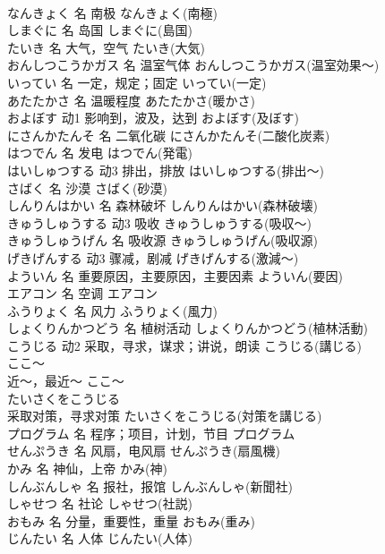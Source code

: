 \documentclass[8pt]{extreport}
\begin{document}
\begin{CJK}{UTF8}{min}
\\	なんきょく	名	南极	なんきょく(南極)	
\\	しまぐに	名	岛国	しまぐに(島国)	
\\	たいき	名	大气，空气	たいき(大気)	
\\	おんしつこうかガス	名	温室气体	おんしつこうかガス(温室効果～)	
\\	いってい	名	一定，规定；固定	いってい(一定)	
\\	あたたかさ	名	温暖程度	あたたかさ(暖かさ)	
\\	およぼす	动1	影响到，波及，达到	およぼす(及ぼす)	
\\	にさんかたんそ	名	二氧化碳	にさんかたんそ(二酸化炭素)	
\\	はつでん	名	发电	はつでん(発電)	
\\	はいしゅつする	动3	排出，排放	はいしゅつする(排出～)	
\\	さばく	名	沙漠	さばく(砂漠)	
\\	しんりんはかい	名	森林破坏	しんりんはかい(森林破壊)	
\\	きゅうしゅうする	动3	吸收	きゅうしゅうする(吸収～)	
\\	きゅうしゅうげん	名	吸收源	きゅうしゅうげん(吸収源)	
\\	げきげんする	动3	骤减，剧减	げきげんする(激減～)	
\\	よういん	名	重要原因，主要原因，主要因素	よういん(要因)	
\\	エアコン	名	空调	エアコン	
\\	ふうりょく	名	风力	ふうりょく(風力)	
\\	しょくりんかつどう	名	植树活动	しょくりんかつどう(植林活動)	
\\	こうじる	动2	采取，寻求，谋求；讲说，朗读	こうじる(講じる)	
\\	ここ～	
\\	近～，最近～	ここ～	
\\	たいさくをこうじる	
\\	采取对策，寻求对策	たいさくをこうじる(対策を講じる)	
\\	プログラム	名	程序；项目，计划，节目	プログラム	
\\	せんぷうき	名	风扇，电风扇	せんぷうき(扇風機)	
\\	かみ	名	神仙，上帝	かみ(神)	
\\	しんぶんしゃ	名	报社，报馆	しんぶんしゃ(新聞社)	
\\	しゃせつ	名	社论	しゃせつ(社説)	
\\	おもみ	名	分量，重要性，重量	おもみ(重み)	
\\	じんたい	名	人体	じんたい(人体)	

\end{CJK}
\end{document}
